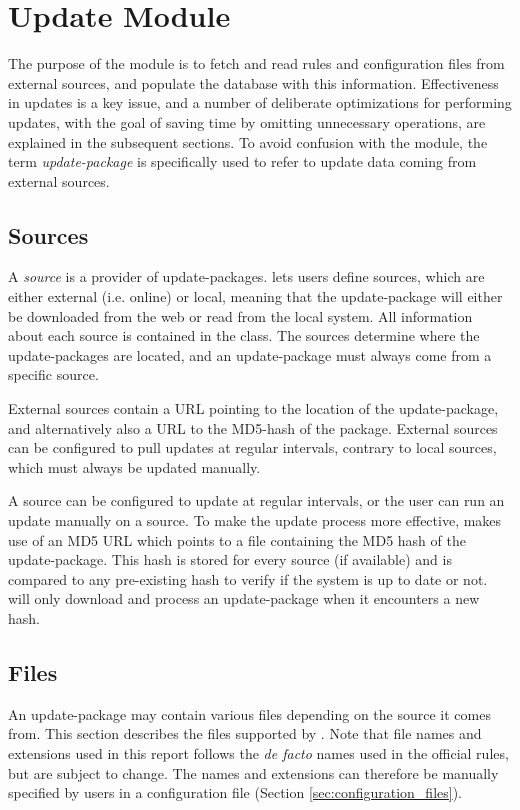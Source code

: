 \section{Update Module}
The purpose of the  module is to fetch and read rules and
configuration files from external sources, and populate the database with this information.
Effectiveness in updates is a key issue, and a number of deliberate
optimizations for performing updates, with the goal of saving time by omitting
unnecessary operations, are explained in the subsequent sections. To avoid
confusion with the module, the term {\em update-package} is specifically
used to refer to update data coming from external sources.

\subsection{Sources}
A {\em source} is a provider of update-packages. \snowman{} lets users define
sources, which are either external (i.e. online) or local, meaning that
the update-package will either be downloaded from the web or read from the
local system. All information about each source is contained in the
 class. The sources determine where the update-packages are
located, and an update-package must always come from a specific source.

External sources contain a URL pointing to the location of the update-package,
and alternatively also a URL to the MD5-hash of the package. External sources
can be configured to pull updates at regular intervals, contrary to local
sources, which must always be updated manually.

A source can be configured to update at regular intervals, or the user can run
an update manually on a source.
To make the update process more effective,  makes use of an
MD5 URL which points to a file containing the MD5 hash of the update-package.
This hash is stored for every source (if available) and is compared to any
pre-existing hash to verify if the system is up to date or not.
 will only download and process an update-package when it
encounters a new hash.

\subsection{Files}
\label{sec:update.files}
An update-package may contain various files depending on the source it comes
from. This section describes the files supported by \snowman{}. Note that
file names and extensions used in this report follows the {\em de facto} names
used in the official \snort{} rules, but are subject to change. The names and
extensions can therefore be manually specified by \snowman{} users in a
configuration file (Section \ref{sec:configuration_files}).

